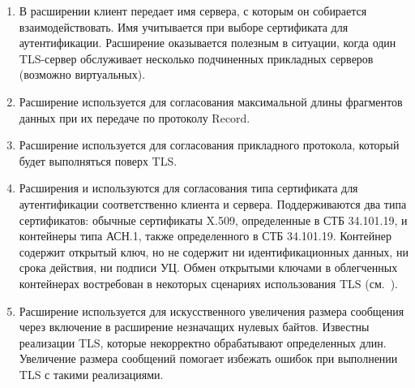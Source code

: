 \begin{enumerate}
\item\label{HS.Ext.sn}
В расширении  клиент передает имя сервера, с которым он 
собирается взаимодействовать. Имя учитывается при выборе сертификата для 
аутентификации. Расширение оказывается полезным в ситуации, когда один 
TLS-сервер обслуживает несколько подчиненных прикладных серверов (возможно  
виртуальных).


\item\label{HS.Ext.mfl}
Расширение  используется для согласования
максимальной длины фрагментов данных при их передаче по протоколу Record.

\item\label{HS.Ext.alpn}
Расширение  используется  
для согласования прикладного протокола, который будет выполняться поверх TLS.

\item\label{HS.Ext.ct}
Расширения  и  
используются для согласования типа сертификата для аутентификации соответственно 
клиента и сервера. Поддерживаются два типа сертификатов: обычные сертификаты 
X.509, определенные в СТБ 34.101.19, и контейнеры типа 
 АСН.1, также определенного в СТБ 34.101.19. 
%
Контейнер содержит открытый ключ, но не содержит ни идентификационных данных, 
ни срока действия, ни подписи УЦ. Обмен открытыми ключами в облегченных 
контейнерах востребован в некоторых сценариях использования TLS 
(см.~\cite{RFC7250}).

\item\label{HS.Ext.p}
Расширение  используется для искусственного увеличения размера 
сообщения  через включение в расширение незначащих
нулевых байтов.
%
Известны реализации TLS, которые некорректно обрабатывают
 определенных длин. Увеличение размера сообщений
помогает избежать ошибок при выполнении TLS с такими реализациями.
\end{enumerate}

